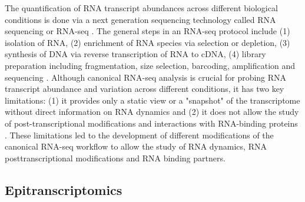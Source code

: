 The quantification of RNA transcript abundances across different biological conditions is done via a next generation sequencing technology called RNA sequencing or RNA-seq  \citep{Nagalakshmi2008}. The general steps in an RNA-seq protocol include (1) isolation of RNA, (2) enrichment of RNA species via selection or depletion, (3) synthesis of DNA via reverse transcription of RNA to cDNA, (4) library preparation including fragmentation, size selection, barcoding, amplification and sequencing \citep{Griffith2015,Wang2009}.
Although canonical RNA-seq analysis is crucial for probing RNA transcript abundance and variation across different conditions, it has two key limitations: (1) it provides only a static view or a  "snapshot" of the transcriptome without direct information on RNA dynamics and (2) it does not allow the study of post-transcriptional modifications and interactions with RNA-binding proteins \citep{Kleiner2021}. These limitations led to the development of different modifications of the canonical RNA-seq workflow to allow the study of RNA dynamics, RNA posttranscriptional modifications and RNA binding partners.

\subsection{Epitranscriptomics}

